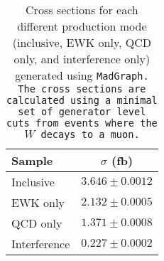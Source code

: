 \begin{table}[htbp]
  \centering
  \begin{tabular}{l | c}
    Sample & $\sigma$ (fb) \\
    \hline\hline
    Inclusive    & $3.646\pm 0.0012$ \\
    EWK only     & $2.132\pm 0.0005$ \\
    QCD only     & $1.371\pm 0.0008$ \\
    Interference & $0.227\pm 0.0002$ \\
    \hline
  \end{tabular}
  \caption{Cross sections for each different \ssww production mode (inclusive, EWK only, QCD only, and interference only) generated using \tt{MadGraph}.  The cross sections are calculated using a minimal set of generator level cuts from events where the $W$ decays to a muon.}
  \label{tab:ssww13tev_uncert_int_xsec}
\end{table}
